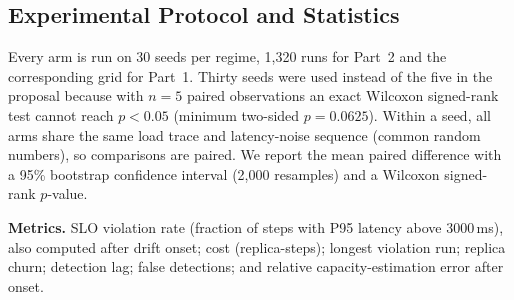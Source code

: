 \subsection{Experimental Protocol and Statistics}
Every arm is run on 30 seeds per regime, 1{,}320 runs for Part~2 and the corresponding grid for Part~1. Thirty seeds were used instead of the five in the proposal because with $n=5$ paired observations an exact Wilcoxon signed-rank test cannot reach $p<0.05$ (minimum two-sided $p=0.0625$). Within a seed, all arms share the same load trace and latency-noise sequence (common random numbers), so comparisons are paired. We report the mean paired difference with a 95\% bootstrap confidence interval (2{,}000 resamples) and a Wilcoxon signed-rank $p$-value.

\textbf{Metrics.} SLO violation rate (fraction of steps with P95 latency above 3000\,ms), also computed after drift onset; cost (replica-steps); longest violation run; replica churn; detection lag; false detections; and relative capacity-estimation error after onset.

